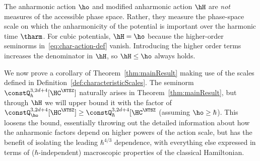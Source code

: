 \documentclass{article}
\numberwithin{equation}{section}
\begin{document}
The anharmonic action $\ho$ and modified anharmonic action $\hH$ are \emph{not} measures of the accessible phase space. Rather, they measure the phase-space scale on which the anharmonicity of the potential is important over the harmonic time $\tharm$.  For cubic potentials, $\hH = \ho$ because the higher-order seminorms in~\eqref{eq:char-action-def} vanish.  Introducing the higher order terms increases the denominator in $\hH$, so $\hH \le \ho$ always holds.


We now prove a corollary of Theorem~\ref{thm:mainResult} making use of the scales defined in Definition~\ref{def:characteristicScales}.  The seminorm $\constQ^{3,2d+4}_\hbar[\HC^\NTSZ]$ naturally arises in Theorem~\ref{thm:mainResult}, but through $\hH$ we will upper bound it with the factor of $\constQ^{3,2d+4}_{\ho}[\HC^\NTSZ] \ge \constQ^{3,2d+4}_\hbar[\HC^\NTSZ$ (assuming $\ho\ge\hbar$). This loosens the bound, essentially throwing out the detailed information about how the anharmonic factors depend on higher powers of the action scale, but has the benefit of isolating the leading $\hbar^{4/3}$ dependence, with everything else expressed in terms of ($\hbar$-independent) macroscopic properties of the classical Hamiltonian.
\end{document}
